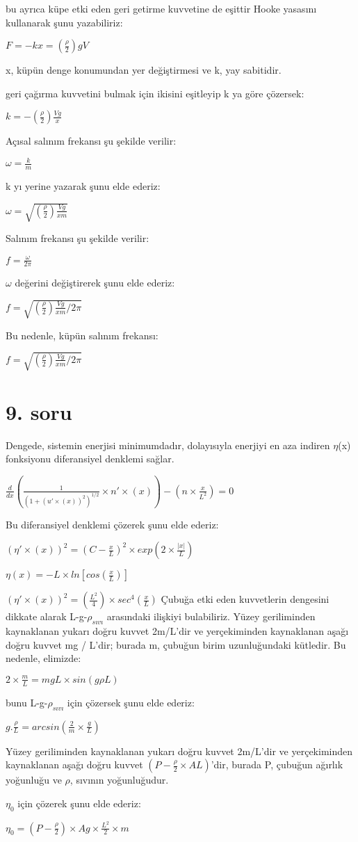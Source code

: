 \documentclass[12pt]{article}
\begin{document}
bu ayrıca küpe etki eden geri getirme kuvvetine de eşittir
\newpage
Hooke yasasını kullanarak şunu yazabiliriz:

$F=-kx=(\frac{\rho}{2})gV$

x, küpün denge konumundan yer değiştirmesi ve k, yay sabitidir.

geri çağırma kuvvetini bulmak için ikisini eşitleyip k ya göre çözersek:

$k=-(\frac{\rho}{2})\frac{Vg}{x}$

Açısal salınım frekansı şu şekilde verilir:

$\omega=\frac{k}{m}$

k yı yerine yazarak şunu elde ederiz:

$\omega=\sqrt{(\frac{\rho}{2})\frac{Vg}{xm}}$

Salınım frekansı şu şekilde verilir:

$f=\frac{\omega}{2\pi}$

$\omega$ değerini değiştirerek şunu elde ederiz:

$f=\sqrt{(\frac{\rho}{2})\frac{Vg}{xm}/2\pi}$

Bu nedenle, küpün salınım frekansı:

$f=\sqrt{(\frac{\rho}{2})\frac{Vg}{xm}/2\pi}$



\newpage
\section{9. soru}
Dengede, sistemin enerjisi minimumdadır, dolayısıyla enerjiyi en aza indiren $\eta$(x) fonksiyonu diferansiyel denklemi sağlar.

$\frac{d}{dx}(\frac{1}{(1+(u'\times(x))^2)^{1/2}}\times n'\times(x))-(n\times\frac{x}{L^2})=0$

Bu diferansiyel denklemi çözerek şunu elde ederiz:

$(\eta'\times(x))^2=(C-\frac{x}{L})^2\times exp(2\times\frac{|x|}{L})$

$\eta(x)=-L\times ln[cos(\frac{x}{L})]$

$(\eta'\times(x))^2=(\frac{L^2}{4})\times sec^4(\frac{x}{L})$
\bigbreak
Çubuğa etki eden kuvvetlerin dengesini dikkate alarak L-g-$\rho_{sıvı}$ arasındaki ilişkiyi bulabiliriz. Yüzey geriliminden kaynaklanan yukarı doğru kuvvet 2m/L'dir ve yerçekiminden kaynaklanan aşağı doğru kuvvet mg / L'dir; burada m, çubuğun birim uzunluğundaki kütledir. Bu nedenle, elimizde:
\bigbreak

$2\times\frac{m}{L}=mgL\times sin(g\rho L)$

bunu  L-g-$\rho_{sıvı}$ için çözersek şunu elde ederiz:

$g.\frac{\rho}{L}=arcsin(\frac{2}{m}\times\frac{g}{L})$

Yüzey geriliminden kaynaklanan yukarı doğru kuvvet 2m/L'dir ve yerçekiminden kaynaklanan aşağı doğru kuvvet $(P-\frac{\rho}{2}\times AL)$'dir, burada P, çubuğun ağırlık yoğunluğu ve $\rho$, sıvının yoğunluğudur. 

$\eta_0$ için çözerek şunu elde ederiz:

$\eta_0=(P-\frac{\rho}{2})\times Ag\times\frac{L^2}{2}\times m$
\end{document}
